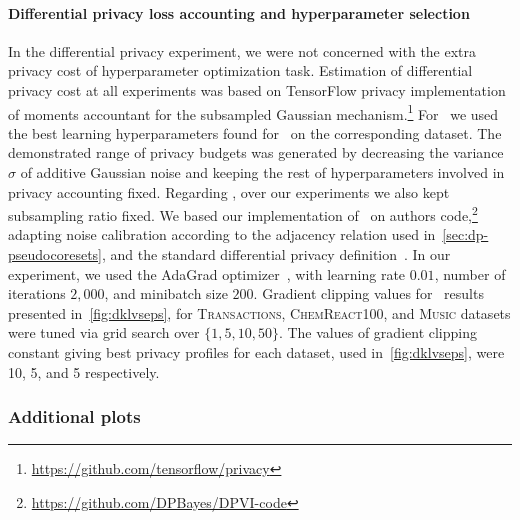\paragraph{Differential privacy loss accounting and hyperparameter selection}  In the differential privacy experiment, we were not concerned with the extra privacy cost of hyperparameter optimization task.  Estimation of differential privacy cost at all experiments was based on TensorFlow privacy implementation of moments accountant for the subsampled Gaussian mechanism.\footnote{\href{https://github.com/tensorflow/privacy}{https://github.com/tensorflow/privacy}} 
For \dpsvi~we used the best learning hyperparameters found for \psvi~on the corresponding dataset. The demonstrated range of privacy budgets was generated by decreasing the variance $ \sigma $ of additive Gaussian noise and keeping the rest of hyperparameters involved in privacy accounting fixed.  
Regarding \dpvi, over our experiments we also kept subsampling ratio fixed. We based our implementation of \dpvi~on authors code,\footnote{\href{https://github.com/DPBayes/DPVI-code}{https://github.com/DPBayes/DPVI-code}} adapting noise calibration according to the adjacency relation used in~\cref{sec:dp-pseudocoresets}, and the standard differential privacy definition~\citep{dwork14}. In our experiment, we used the AdaGrad optimizer~\citep{duchi11}, with learning rate $0.01$, number of iterations $2,000$, and minibatch size $200$. Gradient clipping values for \dpvi~results presented in~\cref{fig:dklvseps}, for \textsc{Transactions}, \textsc{ChemReact100}, and \textsc{Music} datasets were tuned via grid search over ${\{1, 5, 10, 50\}}$. The values of gradient clipping constant giving best privacy profiles for each dataset, used in~\cref{fig:dklvseps}, were 10, 5, and 5 respectively. 



\subsubsection{Additional plots}
\label{app:cpu_timings}

